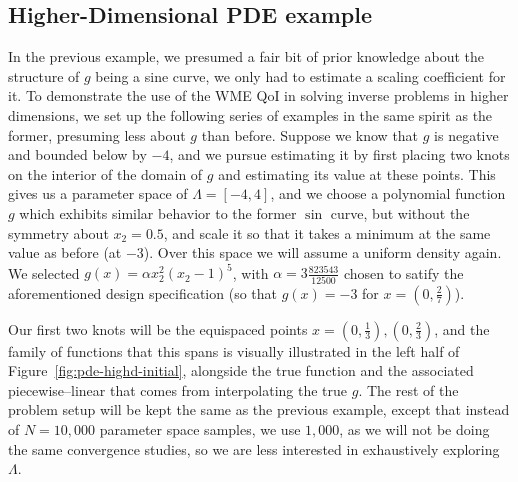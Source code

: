 \subsection{Higher-Dimensional PDE example}
In the previous example, we presumed a fair bit of prior knowledge about the structure of $g$ being a sine curve, we only had to estimate a scaling coefficient for it.
To demonstrate the use of the WME QoI in solving inverse problems in higher dimensions, we set up the following series of examples in the same spirit as the former, presuming less about $g$ than before.
Suppose we know that $g$ is negative and bounded below by $-4$, and we pursue estimating it by first placing two knots on the interior of the domain of $g$ and estimating its value at these points.
This gives us a parameter space of $\Lambda = [-4, 4]$, and we choose a polynomial function $g$ which exhibits similar behavior to the former $\sin$ curve, but without the symmetry about $x_2=0.5$, and scale it so that it takes a minimum at the same value as before (at $-3$).
Over this space we will assume a uniform density again.
We selected $g(x) = \alpha x_2^2 (x_2 - 1)^5$, with $\alpha = 3\frac{823543}{12500}$ chosen to satify the aforementioned design specification (so that $g(x)=-3$ for $x=(0,\frac{2}{7})$).

Our first two knots will be the equispaced points $x = (0,\frac{1}{3}), (0,\frac{2}{3})$, and the family of functions that this spans is visually illustrated in the left half of Figure~\ref{fig:pde-highd-initial}, alongside the true function and the associated piecewise--linear that comes from interpolating the true $g$.
The rest of the problem setup will be kept the same as the previous example, except that instead of $N=10,000$ parameter space samples, we use $1,000$, as we will not be doing the same convergence studies, so we are less interested in exhaustively exploring $\Lambda$.


